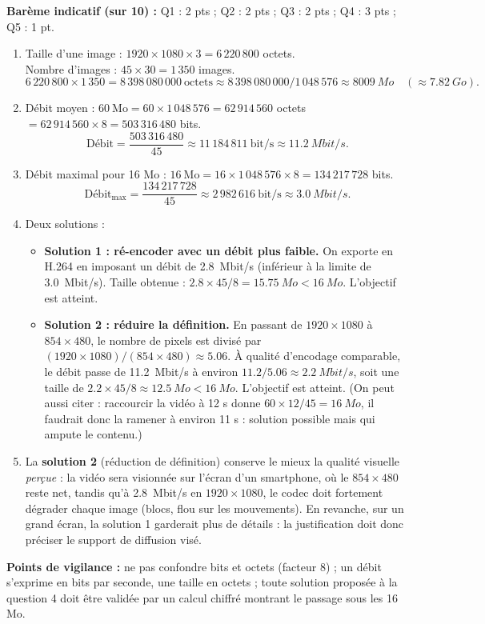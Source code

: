 \documentclass[11pt]{article}
\begin{document}
\begin{corrige}
\textbf{Barème indicatif (sur 10) :} Q1 : 2 pts ; Q2 : 2 pts ; Q3 : 2 pts ; Q4 : 3 pts ; Q5 : 1 pt.

\begin{enumerate}
  \item Taille d'une image : $1920 \times 1080 \times 3 = 6\,220\,800$ octets.\\
  Nombre d'images : $45 \times 30 = 1\,350$ images.
  \[ 6\,220\,800 \times 1\,350 = 8\,398\,080\,000~\text{octets} \approx 8\,398\,080\,000 / 1\,048\,576 \approx \SI{8009}{Mo} \quad (\approx \SI{7,82}{Go}). \]
  \item Débit moyen : $60~\text{Mo} = 60 \times 1\,048\,576 = 62\,914\,560$ octets $= 62\,914\,560 \times 8 = 503\,316\,480$ bits.
  \[ \text{Débit} = \frac{503\,316\,480}{45} \approx 11\,184\,811~\text{bit/s} \approx \SI{11,2}{Mbit/s}. \]
  \item Débit maximal pour 16 Mo : $16~\text{Mo} = 16 \times 1\,048\,576 \times 8 = 134\,217\,728$ bits.
  \[ \text{Débit}_{\max} = \frac{134\,217\,728}{45} \approx 2\,982\,616~\text{bit/s} \approx \SI{3,0}{Mbit/s}. \]
  \item Deux solutions :
  \begin{itemize}
    \item \textbf{Solution 1 : ré-encoder avec un débit plus faible.} On exporte en H.264 en imposant un débit de \SI{2,8}{Mbit/s} (inférieur à la limite de \SI{3,0}{Mbit/s}). Taille obtenue : $\num{2,8} \times 45 / 8 = \SI{15,75}{Mo} < \SI{16}{Mo}$. L'objectif est atteint.
    \item \textbf{Solution 2 : réduire la définition.} En passant de $1920 \times 1080$ à $854 \times 480$, le nombre de pixels est divisé par $(1920 \times 1080)/(854 \times 480) \approx \num{5,06}$. À qualité d'encodage comparable, le débit passe de \SI{11,2}{Mbit/s} à environ $\num{11,2} / \num{5,06} \approx \SI{2,2}{Mbit/s}$, soit une taille de $\num{2,2} \times 45 / 8 \approx \SI{12,5}{Mo} < \SI{16}{Mo}$. L'objectif est atteint. (On peut aussi citer : raccourcir la vidéo à 12 s donne $60 \times 12/45 = \SI{16}{Mo}$, il faudrait donc la ramener à environ 11 s : solution possible mais qui ampute le contenu.)
  \end{itemize}
  \item La \textbf{solution 2} (réduction de définition) conserve le mieux la qualité visuelle \emph{perçue} : la vidéo sera visionnée sur l'écran d'un smartphone, où le $854 \times 480$ reste net, tandis qu'à \SI{2,8}{Mbit/s} en $1920 \times 1080$, le codec doit fortement dégrader chaque image (blocs, flou sur les mouvements). En revanche, sur un grand écran, la solution 1 garderait plus de détails : la justification doit donc préciser le support de diffusion visé.
\end{enumerate}
\textbf{Points de vigilance :} ne pas confondre bits et octets (facteur 8) ; un débit s'exprime en bits par seconde, une taille en octets ; toute solution proposée à la question 4 doit être validée par un calcul chiffré montrant le passage sous les 16 Mo.
\end{corrige}
\end{document}
